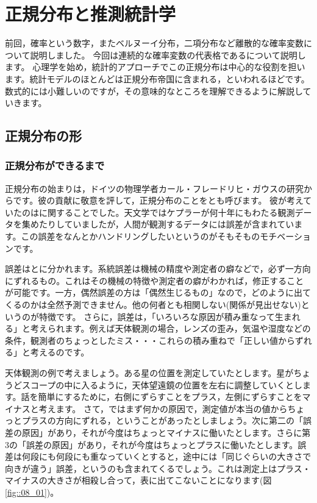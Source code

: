 \documentclass{ltjbook}
\begin{document}
 
\chapter{正規分布と推測統計学} 
\label{chapter8} 
前回，確率という数字，またベルヌーイ分布，二項分布など離散的な確率変数について説明しました。
今回は連続的な確率変数の代表格であるについて説明します。
心理学を始め，統計的アプローチでこの正規分布は中心的な役割を担います。統計モデルのほとんどは正規分布帝国に含まれる，といわれるほどです\citep{三中2018}。
数式的には小難しいのですが，その意味的なところを理解できるように解説していきます。

\section{正規分布の形}
\subsection{正規分布ができるまで}
正規分布の始まりは，ドイツの物理学者カール・フレードリヒ・ガウスの研究からです。彼の貢献に敬意を評して，正規分布のことをとも呼びます。
彼が考えていたのはに関することでした。天文学ではケプラーが何十年にもわたる観測データを集めたりしていましたが，人間が観測するデータには誤差が含まれています。この誤差をなんとかハンドリングしたいというのがそもそものモチベーションです。

誤差はとに分かれます。系統誤差は機械の精度や測定者の癖などで，必ず一方向にずれるもの。これはその機械の特徴や測定者の癖がわかれば，修正することが可能です。一方，偶然誤差の方は「偶然生じるもの」なので，どのように出てくるのかは全然予測できません。他の何者とも相関しない(関係が見出せない)というのが特徴です。
さらに，誤差は，「いろいろな原因が積み重なって生まれる」と考えられます。例えば天体観測の場合，レンズの歪み，気温や湿度などの条件，観測者のちょっとしたミス・・・これらの積み重ねで「正しい値からずれる」と考えるのです。

天体観測の例で考えましょう。ある星の位置を測定していたとします。星がちょうどスコープの中に入るように，天体望遠鏡の位置を左右に調整していくとします。話を簡単にするために，右側にずらすことをプラス，左側にずらすことをマイナスと考えます。
さて，ではまず何かの原因で，測定値が本当の値からちょっとプラスの方向にずれる，ということがあったとしましょう。次に第二の「誤差の原因」があり，それが今度はちょっとマイナスに働いたとします。さらに第3の「誤差の原因」があり，それが今度はちょっとプラスに働いたとします。誤差は何段にも何段にも重なっていくとすると，途中には「同じぐらいの大きさで向きが違う」誤差，というのも含まれてくるでしょう。これは測定上はプラス・マイナスの大きさが相殺し合って，表に出てこないことになります(図\ref{fig::08_01})。
\end{document}
